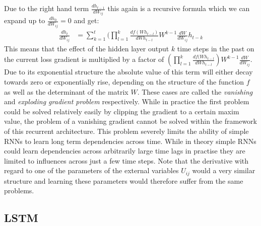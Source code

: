 Due to the right hand term $\frac{dh_{t-1}}{dW_{ij}}$ this again is a recursive formula which we can expand up to $ \frac{dh_{0}}{dW_{ij}} = 0$ and get:
\begin{align*}
\frac{dh_t}{dW_{ij}} &= \sum_{k = 1}^t( \prod_{l = 1}^k \frac{df(Wh_{t-l})}{dWh_{t-l}} W^{k-1} \frac{dW}{dW_{ij}} h_{t-k}
\end{align*}
This means that the effect of the hidden layer output $k$ time steps in the past on the current loss gradient is multiplied by a factor of $(\prod_{l = 1}^k \frac{df(Wh_{t-l}}{dWh_{t-l}}) W^{k-1}\frac{dW}{dW_{ij}}$. Due to its exponential structure the absolute value of this term  will either decay towards zero or exponentially rise, depending on the structure of the function $f$ as well as the determinant of the matrix $W$. These cases are called the \textit{vanishing} and \textit{exploding gradient problem} respectively. While in practice the first problem could be solved relatively easily by clipping the gradient to a certain maxim value, the problem of a vanishing gradient cannot be solved within the framework of this recurrent architecture. This problem severely limits the ability of simple RNNs to learn long term dependencies across time. While in theory simple RNNs could learn dependencies across arbitrarily large time lags in practise they are limited to influences across just a few time steps. Note that the derivative with regard to one of the parameters of the external variables $U_{ij}$ would a very similar structure and learning these parameters would therefore suffer from the same problems.


\subsection{LSTM}


